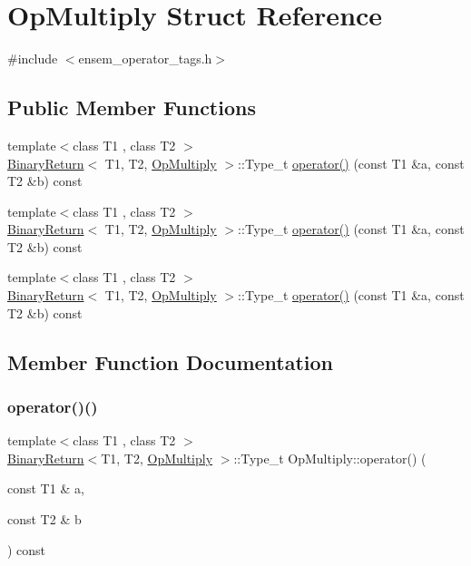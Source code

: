 \hypertarget{structOpMultiply}{}\section{Op\+Multiply Struct Reference}
\label{structOpMultiply}


{\ttfamily \#include $<$ensem\+\_\+operator\+\_\+tags.\+h$>$}

\subsection*{Public Member Functions}
\begin{DoxyCompactItemize}
\item 
{\footnotesize template$<$class T1 , class T2 $>$ }\\\mbox{\hyperlink{structBinaryReturn}{Binary\+Return}}$<$ T1, T2, \mbox{\hyperlink{structOpMultiply}{Op\+Multiply}} $>$\+::Type\+\_\+t \mbox{\hyperlink{structOpMultiply_a47917bc9d52d19692e9716a60938d364}{operator()}} (const T1 \&a, const T2 \&b) const
\item 
{\footnotesize template$<$class T1 , class T2 $>$ }\\\mbox{\hyperlink{structBinaryReturn}{Binary\+Return}}$<$ T1, T2, \mbox{\hyperlink{structOpMultiply}{Op\+Multiply}} $>$\+::Type\+\_\+t \mbox{\hyperlink{structOpMultiply_a47917bc9d52d19692e9716a60938d364}{operator()}} (const T1 \&a, const T2 \&b) const
\item 
{\footnotesize template$<$class T1 , class T2 $>$ }\\\mbox{\hyperlink{structBinaryReturn}{Binary\+Return}}$<$ T1, T2, \mbox{\hyperlink{structOpMultiply}{Op\+Multiply}} $>$\+::Type\+\_\+t \mbox{\hyperlink{structOpMultiply_a47917bc9d52d19692e9716a60938d364}{operator()}} (const T1 \&a, const T2 \&b) const
\end{DoxyCompactItemize}


\subsection{Member Function Documentation}
\mbox{\label{structOpMultiply_a47917bc9d52d19692e9716a60938d364}} 
\subsubsection{\texorpdfstring{operator()()}{operator()()}\hspace{0.1cm}{\footnotesize\ttfamily [1/3]}}
{\footnotesize\ttfamily template$<$class T1 , class T2 $>$ \\
\mbox{\hyperlink{structBinaryReturn}{Binary\+Return}}$<$T1, T2, \mbox{\hyperlink{structOpMultiply}{Op\+Multiply}} $>$\+::Type\+\_\+t Op\+Multiply\+::operator() (\begin{DoxyParamCaption}\item[{const T1 \&}]{a,  }\item[{const T2 \&}]{b }\end{DoxyParamCaption}) const\hspace{0.3cm}{\ttfamily [inline]}}

